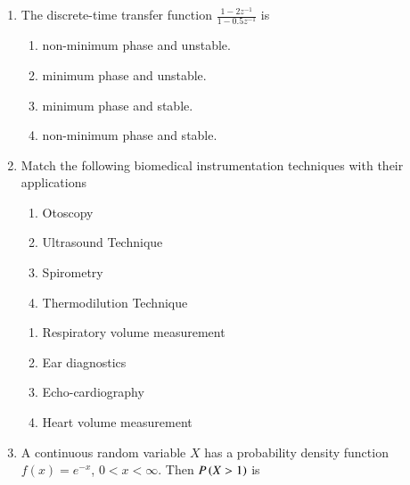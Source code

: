 \documentclass[journal,12pt,onecolumn]{IEEEtran}
\theoremstyle{remark}
\begin{document}
\begin{enumerate}
\item The discrete-time transfer function $\frac{1-2z^{-1}}{1-0.5z^{-1}}$ is
\par \hfill{}
    \begin{enumerate}
    \item non-minimum phase and unstable.
    \item minimum phase and unstable.
    \item minimum phase and stable.
    \item non-minimum phase and stable.
    \end{enumerate}
\item Match the following biomedical instrumentation techniques with their applications
\par \hfill{}
\begin{multicols}{2}
    \begin{enumerate}[start = 16]
        \item Otoscopy
        \item Ultrasound Technique
        \item  Spirometry 
        \item Thermodilution Technique
    \end{enumerate}
        \columnbreak

        \begin{enumerate}[start = 21]
            \item Respiratory volume measurement
            \item Ear diagnostics 
            \item Echo-cardiography 
            \item Heart volume measurement 
        \end{enumerate}
\end{multicols}
    \begin{enumerate}
    \end{enumerate}

\item A continuous random variable $X$ has a probability density function $f(x) = e^{-x}$, $0 < x < \infty$. Then $P\left(X > 1\right)$ is  
\par \hfill{}
\begin{enumerate}
\end{enumerate}


\end{enumerate}
\end{document}
